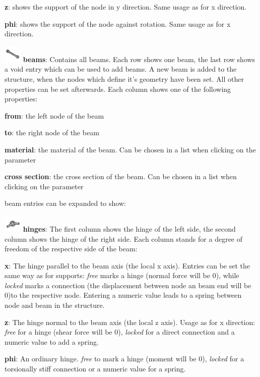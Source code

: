 \documentclass[a4paper,11pt]{report}
\begin{document}
\begin{trivlist}
\begin{trivlist}
\begin{trivlist}
		\item[]\textbf{z}: shows the support of the node in y direction. Same usage as for x direction.
		\item[]\textbf{phi}: shows the support of the node against rotation. Same usage as for x direction.
		\end{trivlist}
	\end{trivlist}
	\item[] \includegraphics[scale = 0.5]{../../icons/beam.png} \textbf{beams}: Contains all beams. Each row shows one beam, the last row shows a void entry which can be used to add beams. A new beam is added to the structure, when the nodes which define it's geometry have been set. All other properties can be set afterwards. Each column shows one of the following properties:
	\begin{trivlist}
		\leftskip=1cm		
		\item[]\textbf{from}: the left node of the beam
		\item[]\textbf{to}: the right node of the beam
		\item[]\textbf{material}: the material of the beam. Can be chosen in a list when clicking on the parameter
		\item[]\textbf{cross section}: the cross section of the beam. Can be chosen in a list when clicking on the parameter
	\end{trivlist}
	beam entries can be expanded to show:
	\begin{trivlist}
		\leftskip=1cm
		\item[] \includegraphics[scale = 0.5]{../../icons/joint.png} \textbf{hinges}: The first column shows the hinge of the left side, the second column shows the hinge of the right side. Each column stands for a degree of freedom of the respective side of the beam:
		\begin{trivlist}
		\leftskip=2cm
		\item[] \textbf{x}: The hinge parallel to the beam axis (the local x axis). Entries can be set the same way as for supports: \textit{free} marks a hinge (normal force will be 0), while \textit{locked} marks a connection (the displacement between node an beam end will be 0)to the respective node. Entering a numeric value leads to a spring between node and beam in the structure.
		\item[] \textbf{z}: The hinge normal to the beam axis (the local z axis). Usage as for x direction: \textit{free} for a hinge (shear force will be 0), \textit{locked} for a direct connection and a numeric value to add a spring.
		\item[] \textbf{phi}: An ordinary hinge. \textit{free} to mark a hinge (moment will be 0), \textit{locked} for a torsionally stiff connection or a numeric value for a spring.
		\end{trivlist}
	\end{trivlist}
	

\end{trivlist}
\end{document}
